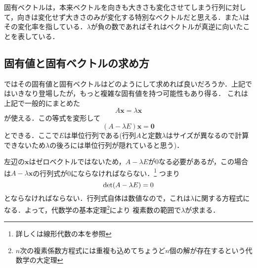 \documentclass[a4paper,12pt,autodetect-engine,dvipdfmx]{jsarticle}
\theoremstyle{definition}
\begin{document}
固有ベクトルは，本来ベクトルを向きも大きさも変化させてしまう行列に対して，向きは変化せず大きさのみが変化する特別なベクトルだと思える．また$\lambda$はその変化率を指している．$\lambda$が負の数であればそれはベクトルが真逆に向いたことを表している．

\subsection{固有値と固有ベクトルの求め方}
ではその固有値と固有ベクトルはどのようにして求めれば良いだろうか．上記ではいきなり登場したが，もっと複雑な固有値を持つ可能性もあり得る．
これは上記で一般的にまとめた
\begin{equation*}
    A \bm{x} = \lambda \bm{x}
\end{equation*}
が使える．この等式を変形して
\begin{equation*}
    (A -\lambda E)\bm{x} = \bm{0}
\end{equation*}
とできる．ここで$E$は単位行列である(行列$A$と定数$\lambda$はサイズが異なるので計算できないため$\lambda$の後ろには単位行列が隠れていると思う)．

左辺の$\bm{x}$はゼロベクトルではないため，$A - \lambda E$が0なる必要があるが，この場合は$A - \lambda \bm{x}$の行列式が0にならなければならない．\footnote{詳しくは線形代数の本を参照}
つまり
\begin{equation*}
    {\rm{det}}(A-\lambda E) = 0
\end{equation*}
とならなければならない．行列式自体は数値なので，これは$\lambda$に関する方程式になる．よって，代数学の基本定理\footnote{$n$次の複素係数方程式には重複も込めてちょうど$n$個の解が存在するという代数学の大定理}により
複素数の範囲で$\lambda$が求まる．
\end{document}
